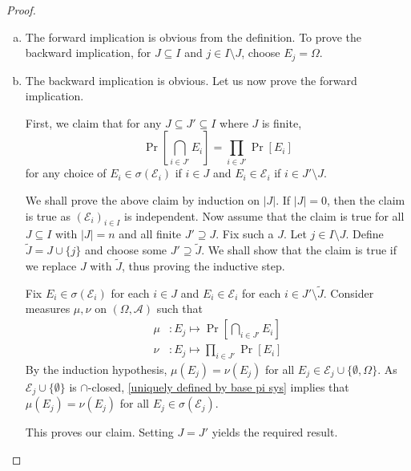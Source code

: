 \begin{proof}
    ~
    \begin{enumerate}[(a)]
        \item The forward implication is obvious from the definition. To prove the backward implication, for $J\subseteq I$ and $j\in I\setminus J$, choose $E_j=\Omega$.
        
        \item The backward implication is obvious. Let us now prove the forward implication.
        
        First, we claim that for any $J\subseteq J'\subseteq I$ where $J$ is finite, 
        $$\Pr\left[\bigcap_{i\in J'}E_i\right] = \prod_{i\in J'}\Pr[E_i]$$
        for any choice of $E_i\in\sigma(\mathcal{E}_i)$ if $i\in J$ and
        $E_i\in\mathcal{E}_i$ if $i\in J'\setminus J$.
        
        We shall prove the above claim by induction on $|J|$. If $|J|=0$, then the claim is true as $(\mathcal{E}_i)_{i\in I}$ is independent. Now assume that the claim is true for all $J\subseteq I$ with $|J|=n$ and all finite $J'\supseteq J$. Fix such a $J$. Let $j\in I\setminus J$. Define $\tilde J=J\cup\{j\}$ and choose some $J'\supseteq\tilde J$. We shall show that the claim is true if we replace $J$ with $\tilde J$, thus proving the inductive step.
    
        Fix $E_i\in\sigma(\mathcal{E}_i)$ for each $i\in J$ and $E_i\in\mathcal{E}_i$ for each $i\in J'\setminus\tilde J$. Consider measures $\mu,\nu$ on $(\Omega,\mathcal{A})$ such that
        \begin{align*}
            \mu &: E_j\mapsto \Pr\left[\bigcap_{i\in J'}E_i\right] \\
            \nu &: E_j\mapsto \prod_{i\in J'}\Pr[E_i]
        \end{align*}
        By the induction hypothesis, $\mu(E_j)=\nu(E_j)$ for all $E_j\in\mathcal{E}_j\cup\{\emptyset,\Omega\}$. As $\mathcal{E}_j\cup\{\emptyset\}$ is $\cap$-closed, \ref{uniquely defined by base pi sys} implies that $\mu(E_j)=\nu(E_j)$ for all $E_j\in\sigma(\mathcal{E}_j)$.
        
        This proves our claim. Setting $J=J'$ yields the required result.
    
    \end{enumerate}
\end{proof}
